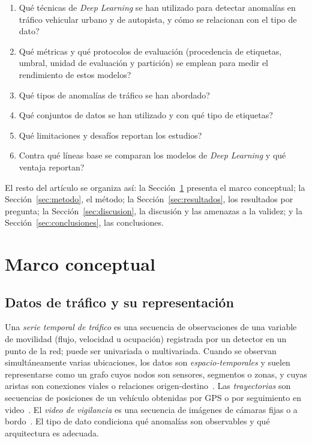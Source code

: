 \documentclass[12pt, a4paper]{article}
\begin{document}
\begin{preguntabox}
  \begin{enumerate}[label=\textbf{RQ\arabic*:}, leftmargin=3em]
    \item \textquestiondown Qu\'{e} t\'{e}cnicas de \textit{Deep Learning} se han utilizado para detectar anomal\'{i}as en tr\'{a}fico vehicular urbano y de autopista, y c\'{o}mo se relacionan con el tipo de dato?
    \item \textquestiondown Qu\'{e} m\'{e}tricas y qu\'{e} protocolos de evaluaci\'{o}n (procedencia de etiquetas, umbral, unidad de evaluaci\'{o}n y partici\'{o}n) se emplean para medir el rendimiento de estos modelos?
    \item \textquestiondown Qu\'{e} tipos de anomal\'{i}as de tr\'{a}fico se han abordado?
    \item \textquestiondown Qu\'{e} conjuntos de datos se han utilizado y con qu\'{e} tipo de etiquetas?
    \item \textquestiondown Qu\'{e} limitaciones y desaf\'{i}os reportan los estudios?
    \item \textquestiondown Contra qu\'{e} l\'{i}neas base se comparan los modelos de \textit{Deep Learning} y qu\'{e} ventaja reportan?
  \end{enumerate}
\end{preguntabox}

El resto del art\'{i}culo se organiza as\'{i}: la Secci\'{o}n~\ref{sec:marco} presenta el marco conceptual; la Secci\'{o}n~\ref{sec:metodo}, el m\'{e}todo; la Secci\'{o}n~\ref{sec:resultados}, los resultados por pregunta; la Secci\'{o}n~\ref{sec:discusion}, la discusi\'{o}n y las amenazas a la validez; y la Secci\'{o}n~\ref{sec:conclusiones}, las conclusiones.

\section{Marco conceptual}
\label{sec:marco}

\subsection{Datos de tr\'{a}fico y su representaci\'{o}n}

Una \textit{serie temporal de tr\'{a}fico} es una secuencia de observaciones de una variable de movilidad (flujo, velocidad u ocupaci\'{o}n) registrada por un detector en un punto de la red; puede ser univariada o multivariada. Cuando se observan simult\'{a}neamente varias ubicaciones, los datos son \textit{espacio-temporales} y suelen representarse como un grafo cuyos nodos son sensores, segmentos o zonas, y cuyas aristas son conexiones viales o relaciones origen-destino~\cite{djenouri2019survey}. Las \textit{trayectorias} son secuencias de posiciones de un veh\'{i}culo obtenidas por GPS o por seguimiento en video~\cite{belhadi2020trajectory}. El \textit{video de vigilancia} es una secuencia de im\'{a}genes de c\'{a}maras fijas o a bordo~\cite{santhosh2020anomaly}. El tipo de dato condiciona qu\'{e} anomal\'{i}as son observables y qu\'{e} arquitectura es adecuada.
\end{document}

